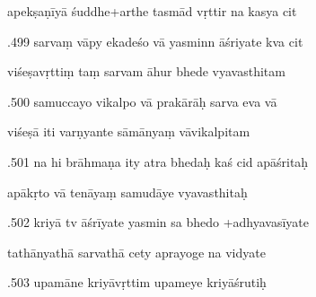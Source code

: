 \documentclass[article,12pt,a4paper]{memoir}%
\newcounter{parCount}
\begin{document}
	  
	  \pstart \leavevmode%
	apekṣaṇīyā śuddhe+arthe tasmād vṛttir na kasya cit 
	{}
	\pend%
      

	  
	  \pstart {}.499 sarvaṃ vāpy ekadeśo vā yasminn āśriyate kva cit 
	{}
	\pend%
      

	  
	  \pstart \leavevmode%
	viśeṣavṛttiṃ taṃ sarvam āhur bhede vyavasthitam 
	{}
	\pend%
      

	  
	  \pstart {}.500 samuccayo vikalpo vā prakārāḥ sarva eva vā 
	{}
	\pend%
      

	  
	  \pstart \leavevmode%
	viśeṣā iti varṇyante sāmānyaṃ vāvikalpitam 
	{}
	\pend%
      

	  
	  \pstart {}.501 na hi brāhmaṇa ity atra bhedaḥ kaś cid apāśritaḥ 
	{}
	\pend%
      

	  
	  \pstart \leavevmode%
	apākṛto vā tenāyaṃ samudāye vyavasthitaḥ 
	{}
	\pend%
      

	  
	  \pstart {}.502 kriyā tv āśrīyate yasmin sa bhedo +adhyavasīyate 
	{}
	\pend%
      

	  
	  \pstart \leavevmode%
	tathānyathā sarvathā cety aprayoge na vidyate 
	{}
	\pend%
      

	  
	  \pstart {}.503 upamāne kriyāvṛttim upameye kriyāśrutiḥ 
	{}
	\pend%
      
\end{document}
